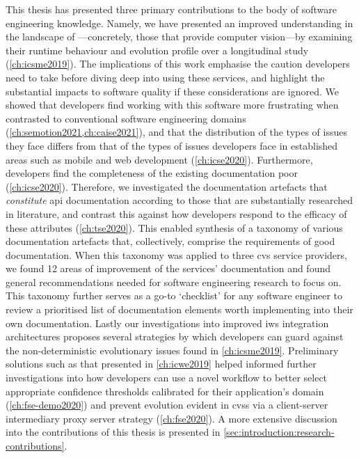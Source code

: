 This thesis has presented three primary contributions to the body of software engineering knowledge. Namely, we have presented an improved understanding in the landscape of ---concretely, those that provide computer vision---by examining their runtime behaviour and evolution profile over a longitudinal study (\cref{ch:icsme2019}). The implications of this work emphasise the caution developers need to take before diving deep into using these services, and highlight the substantial impacts to software quality if these considerations are ignored. We showed that developers find working with this software more frustrating when contrasted to conventional software engineering domains (\cref{ch:semotion2021,ch:caise2021}), and that the distribution of the types of issues they face differs from that of the types of issues developers face in established areas such as mobile and web development (\cref{ch:icse2020}). Furthermore, developers find the completeness of the existing   documentation poor (\cref{ch:icse2020}). Therefore, we investigated the documentation artefacts that \textit{constitute} \gls{api} documentation according to those that are substantially researched in literature, and contrast this against how developers respond to the efficacy of these attributes (\cref{ch:tse2020}). This enabled synthesis of a taxonomy of various documentation artefacts that, collectively, comprise the requirements of good  documentation. When this taxonomy was applied to three \gls{cvs} service providers, we found 12 areas of improvement of the services' documentation and found general recommendations needed for software engineering research to focus on. This taxonomy further serves as a go-to `checklist' for any software engineer to review a prioritised list of documentation elements worth implementing into their own  documentation. Lastly our investigations into improved \gls{iws} integration architectures proposes several strategies by which developers can guard against the non-deterministic evolutionary issues found in \cref{ch:icsme2019}. Preliminary solutions such as that presented in \cref{ch:icwe2019} helped informed further investigations into how developers can use a novel workflow to better select appropriate confidence thresholds calibrated for their application's domain (\cref{ch:fse-demo2020}) and prevent evolution evident in \glspl{cvs} via a client-server intermediary proxy server strategy (\cref{ch:fse2020}). A more extensive discussion into the contributions of this thesis is presented in \cref{sec:introduction:research-contributions}.

